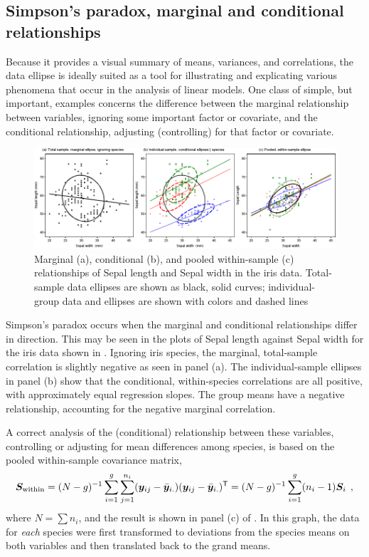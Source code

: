 \subsection{Simpson's paradox, marginal and conditional relationships}\label{sec:simpson-iris}

Because it provides a visual summary of means, variances, and correlations,
the data ellipse is ideally suited as a tool for illustrating and
explicating various
phenomena that occur in the analysis of linear models.
One class of simple, but important, examples concerns the difference between the marginal
relationship between variables, ignoring some important factor or covariate,
and the conditional relationship, adjusting (controlling) for that
factor or covariate.

\begin{figure}[htb]
  \centering
  \includegraphics[width=\textwidth,clip]{fig/contiris3}
  \caption{Marginal (a), conditional (b), and pooled within-sample (c) relationships
  of Sepal length and Sepal width in the iris data. Total-sample data ellipses are
  shown as black, solid curves; individual-group data and ellipses are shown with
  colors and dashed lines}%
  \label{fig:contiris3}
\end{figure}

Simpson's paradox \citep{Simpson:51} occurs when the marginal and
conditional relationships differ in direction. This may be seen in the plots
of Sepal length against Sepal width for the iris data shown in . Ignoring
iris species, the marginal, total-sample correlation is slightly negative
as seen in panel (a). The individual-sample ellipses in panel (b) show
that the conditional, within-species correlations are all positive, with
approximately equal regression slopes.  The group means have a negative
relationship, accounting for the negative marginal correlation.

A correct analysis of the (conditional) relationship between these variables, controlling or adjusting for mean
differences among species, is based on the pooled within-sample covariance matrix,
  \begin{equation} \label{eq:Sp}
  \bm{S}_{\textrm{within}}  = (N - g)^{-1}
  \sum_{i=1}^g
  \sum_{j=1}^{n_i}
  ( \bm{y}_{ij}  -  \bar{\bm{y}}_{i.} )
  ( \bm{y}_{ij}  -  \bar{\bm{y}}_{i.} ) ^\mathsf{T}
  =(N - g)^{-1}
  \sum_{i=1}^g
  (n_i - 1) \bm{S}_i
  \:\: ,
  \end{equation}
where $N = \sum n_i$, and the result
is shown in
panel (c) of .
In this graph, the data for \emph{each} species were first
transformed to deviations from the species means on both variables
and then translated back to the grand means.

